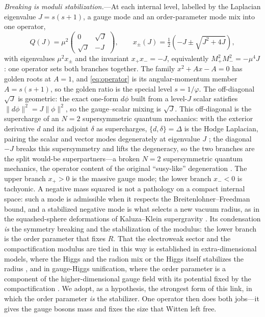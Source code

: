 \documentclass[aps,prl,reprint,superscriptaddress,nofootinbib]{revtex4-2}
\begin{document}
\textit{Breaking is moduli stabilization.}---At each internal level, labelled by
the Laplacian eigenvalue $J=s(s+1)$, a gauge mode and an order-parameter mode
mix into one operator,
\begin{equation}
Q(J)=\mu^2\begin{pmatrix}0&\sqrt J\\ \sqrt J&-J\end{pmatrix},
\qquad
x_\pm(J)=\tfrac12\!\left(-J\pm\sqrt{J^2+4J}\right),
\label{eq:operator}
\end{equation}
with eigenvalues $\mu^2x_\pm$ and the invariant $x_+x_-=-J$, equivalently
$M_+^2M_-^2=-\mu^4J$: one operator sets both branches together. The family
$x^2+Ax-A=0$ has golden roots at $A=1$, and \eqref{eq:operator} is its
angular-momentum member $A=s(s+1)$, so the golden ratio is the special level
$s=1/\varphi$. The off-diagonal
$\sqrt J$ is
geometric: the exact one-form $d\phi$ built from a level-$J$ scalar satisfies
$\|d\phi\|^2=J\|\phi\|^2$, so the gauge--scalar mixing is $\sqrt J$. This off-diagonal is the supercharge of
an $N=2$ supersymmetric quantum mechanics: with the exterior derivative $d$ and
its adjoint $\delta$ as supercharges, $\{d,\delta\}=\Delta$ is the Hodge
Laplacian, pairing the scalar and vector modes degenerately at eigenvalue $J$
\cite{WittenMorse1982}; the diagonal $-J$ breaks this supersymmetry and lifts the
degeneracy, so the two branches are the split would-be superpartners---a broken
$N=2$ supersymmetric quantum mechanics, the operator content of the original
``susy-like'' degeneration \cite{Rivero2006}. The upper
branch $x_+>0$ is the massive gauge mode; the lower branch $x_-<0$ is tachyonic.
A negative mass squared is not a pathology on a compact internal space: such a
mode is admissible when it respects the Breitenlohner--Freedman bound, and a
stabilized negative mode is what selects a new vacuum radius, as in the
squashed-sphere deformations of Kaluza--Klein supergravity
\cite{DuffNilssonPope1986,BreitenlohnerFreedman1982}. Its condensation \emph{is}
the symmetry breaking and the stabilization of the modulus: the lower branch is
the order parameter that fixes $R$. That the electroweak sector and the
compactification modulus are tied in this way is established in extra-dimensional
models, where the Higgs and the radion mix or the Higgs itself stabilizes the
radius \cite{Bucci2004,HabaOda2011}, and in gauge-Higgs unification, where the
order parameter is a component of the higher-dimensional gauge field with its
potential fixed by the compactification \cite{SalamStrathdee1982,Hosotani1983}.
We adopt, as a hypothesis, the strongest form of this link, in which the order
parameter \emph{is} the stabilizer. One operator then does both jobs---it gives
the gauge bosons mass and fixes the size that Witten left free.
\end{document}
